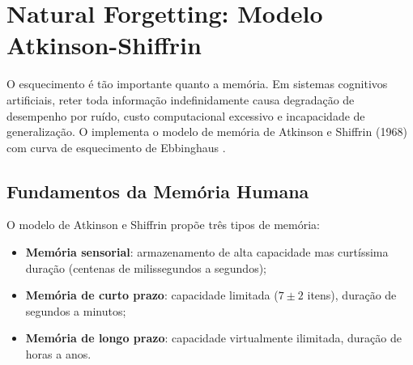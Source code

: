 \section{Natural Forgetting: Modelo Atkinson-Shiffrin}
\label{sec:natural-forgetting}
\nivelphd

O esquecimento é tão importante quanto a memória. Em sistemas
cognitivos artificiais, reter toda informação indefinidamente causa
degradação de desempenho por ruído, custo computacional excessivo e
incapacidade de generalização. O  implementa
o modelo de memória de Atkinson e Shiffrin (1968) com curva de
esquecimento de Ebbinghaus \cite{atkinson1968human}.

\subsection{Fundamentos da Memória Humana}

O modelo de Atkinson e Shiffrin propõe três tipos de memória:

\begin{itemize}
\item \textbf{Memória sensorial}: armazenamento de alta capacidade mas
curtíssima duração (centenas de milissegundos a segundos);
\item \textbf{Memória de curto prazo}: capacidade limitada
($7 \pm 2$ itens), duração de segundos a minutos;
\item \textbf{Memória de longo prazo}: capacidade virtualmente
ilimitada, duração de horas a anos.
\end{itemize}

